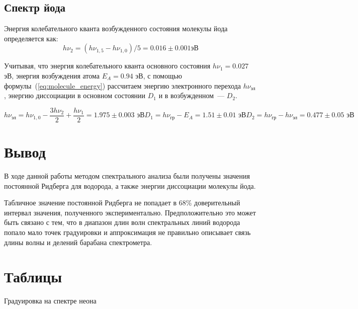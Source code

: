 \documentclass[reprint, nofootinbib, 10pt]{revtex4-2}
\begin{document}
\subsection*{Спектр йода}

Энергия колебательного кванта возбужденного состояния молекулы йода определяется как:
\[ h \nu_2 = (h \nu_{1,5} - h \nu_{1,0})/5 = 0.016 \pm 0.001 \text{эВ} \]

Учитывая, что энергия колебательного кванта основного состояния $h \nu_1 = 0.027$ эВ,
энергия возбуждения атома $E_A = 0.94$ эВ,
с помощью формулы~(\ref{eq:molecule_energy}) рассчитаем энергию электронного перехода
$h \nu_{\text{эл}}$, энергию диссоциации в основном состоянии $D_1$ и в возбужденном~--- $D_2$.

\begin{subequations}
	\begin{equation*}
		h \nu_{\text{эл}} = h \nu_{1, 0} - \frac{3 h \nu_2}{2} + \frac{h \nu_1}{2} = 1.975 \pm 0.003 \text{ эВ}
	\end{equation*}
	\begin{equation*}
		D_1 = h \nu_{\text{гр}} - E_A = 1.51 \pm 0.01 \text{ эВ}
	\end{equation*}
	\begin{equation*}
		D_2 = h \nu_{\text{гр}} - h \nu_{\text{эл}} = 0.477 \pm 0.05 \text{ эВ}
	\end{equation*}
\end{subequations}


\section*{Вывод}

В ходе данной работы методом спектрального анализа были получены значения постоянной Ридберга
для водорода, а также энергии диссоциации молекулы йода.

Табличное значение постоянной Ридберга не попадает в 68\% доверительный интервал значения,
полученного экспериментально. Предположительно это может быть связано с тем, что в диапазон
длин волн спектральных линий водорода попало мало точек градуировки и аппроксимация
не правильно описывает связь длины волны и делений барабана спектрометра.


\newpage
\appendix

\vspace*{1cm}
\section{Таблицы}



\begin{table}[h!]
	\centering
	\caption{Градуировка на спектре неона}
	\label{tab:neon_calibrating}
	\begin{minipage}[h]{0.49\linewidth}
		
	\end{minipage}
	\begin{minipage}[h]{0.49\linewidth}
		
	\end{minipage}
\end{table}


\end{document}

